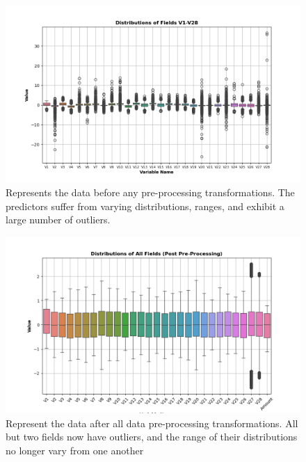 \documentclass[11pt, oneside]{article}   	%
\begin{document}
\begin{figure}[h!]
	\centering
	\includegraphics[width=1.0\textwidth]{figures/fig_5.png}
	\captionsetup{font=small} 
	\caption{Represents the data before any pre-processing transformations. The predictors suffer from varying distributions, ranges, and exhibit a large number of outliers.}
	\label{fig5}
\end{figure}

\begin{figure}[h!]
	\centering
	\includegraphics[width=1.0\textwidth]{figures/fig_6.png}
	\captionsetup{font=small} 
	\caption{Represent the data after all data pre-processing transformations. All but two fields now have outliers, and the range of their distributions no longer vary from one another}
	\label{fig6}
\end{figure}


\end{document}

